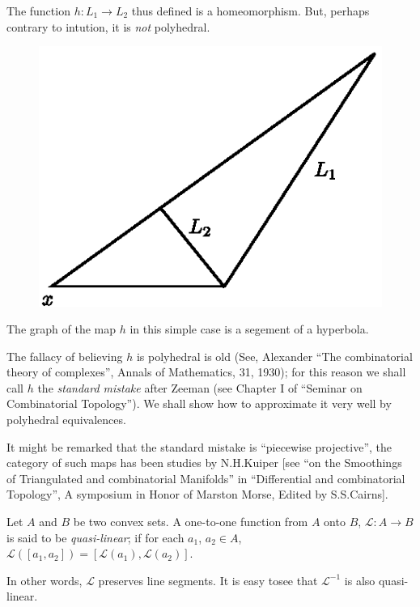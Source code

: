 The function $h:L_{1}\to L_{2}$ thus defined is a homeomorphism. But, perhaps contrary to intution, it is {\em not} polyhedral.
\begin{figure}[H]
\centering
\includegraphics{figure/fig10.eps}
\end{figure}

The graph of the map $h$ in this simple case is a segement of a hyperbola.

The fallacy of believing $h$ is polyhedral is old (See, Alexander ``The combinatorial theory of complexes'', Annals of Mathematics, 31, 1930); for this reason we shall call $h$ the {\em standard mistake} after Zeeman (see Chapter I of ``Seminar on Combinatorial Topology''). We shall show how to approximate it very well by polyhedral equivalences.

It might be remarked that the standard mistake is ``piecewise projective'', the category of such maps has been studies by N.H.\@ Kuiper [see ``on the Smoothings of Triangulated and combinatorial Manifolds'' in ``Differential and combinatorial Topology'', A symposium in Honor of Marston Morse, Edited by S.S.\@ Cairns].

\begin{definition}\label{chap4-defi4.3.13}
Let $A$ and $B$ be two convex sets. A one-to-one function from $A$ onto $B$, $\mathcal{L}:A\to B$ is said to be {\em quasi-linear}; if for each $a_{1}$, $a_{2}\in A$, $\mathcal{L}([a_{1},a_{2}])=[\mathcal{L}(a_{1}), \mathcal{L}(a_{2})]$.
\end{definition}

In other words, $\mathcal{L}$ preserves line segments. It is easy to\pageoriginale see that $\mathcal{L}^{-1}$ is also quasi-linear.


